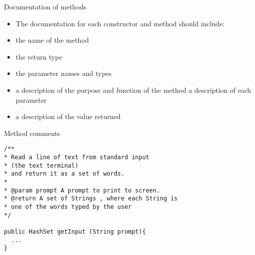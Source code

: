 \documentclass{beamer}
\begin{document}
\begin{frame}
Documentation of methods

\begin{itemize}
\item The documentation for each constructor and method should include:
\item the name of the method
\item the return type
\item the parameter names and types
\item a description of the purpose and function of the method a description of each parameter
\item a description of the value returned
\end{itemize}

\end{frame} 

\begin{frame}[fragile]
Method comments
\begin{block}{}
\begin{lstlisting}
/**
* Read a line of text from standard input 
* (the text terminal) 
* and return it as a set of words.
*
* @param prompt A prompt to print to screen. 
* @return A set of Strings , where each String is 
* one of the words typed by the user
*/

public HashSet getInput (String prompt){
  ...
}
\end{lstlisting}
\end{block}
\end{frame} 
\end{document}
